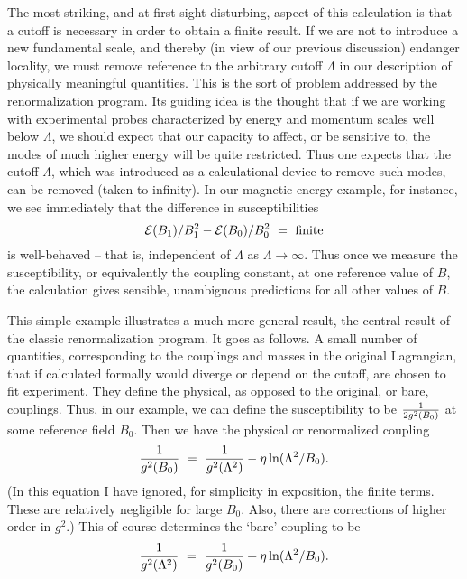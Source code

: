 \documentclass[aps,epsf]{revtex4}
\begin{document}
The most striking, and at first sight
disturbing, aspect of this calculation is that a cutoff is necessary
in order to obtain a finite result.  If we are not to introduce a new
fundamental scale, and thereby (in view of our previous discussion) endanger
locality, we must remove reference to the arbitrary cutoff $\Lambda$
in our description of physically meaningful quantities.  This is the
sort of problem addressed by the renormalization program.  Its guiding
idea is the thought that if we are working with experimental probes
characterized by energy and momentum scales well below $\Lambda$, we
should expect that our capacity to affect, or be sensitive to, the
modes of much higher energy will be quite restricted.  Thus one
expects that the cutoff $\Lambda$, which was
introduced as a calculational device to remove such modes, can be
removed (taken to infinity).  In our magnetic energy example, for
instance, we see immediately that the difference in
susceptibilities
\begin{equation}
{\cal E}(B_1) /B_1^2 - {\cal
E}(B_0)/B_0^2 ~=~ {\rm finite}
\end{equation}
is well-behaved -- that
is, independent of $\Lambda$ as $\Lambda \rightarrow \infty$.  Thus
once we measure the susceptibility, or equivalently the coupling
constant, at one reference value of $B$, the calculation gives
sensible, unambiguous predictions for all other values of $B$.  

This
simple example illustrates a much more general result, the central
result of the classic renormalization program.  It goes as follows.  A
small number of quantities, corresponding to the couplings and masses
in the original Lagrangian, that if calculated formally would diverge
or depend on the cutoff, are chosen to fit experiment.  They define
the physical, as opposed to the original, or bare, couplings.  Thus,
in our example, we can define the susceptibility to be ${1\over 2
g^2(B_0)}$ at some reference field $B_0$.  Then we have the physical or
renormalized coupling
\begin{equation}
{1\over g^2(B_0)} ~=~ {1\over
g^2(\Lambda^2) } - \eta \ln
(\Lambda^2/B_0).\label{eq:dfncouple}
\end{equation}
(In this equation I
have ignored, for simplicity in exposition, the finite terms.  These
are relatively negligible for large $B_0$.  Also, there are
corrections of higher order in $g^2$.) This of course determines the
`bare' coupling to be
\begin{equation}{1\over g^2(\Lambda^2)} ~=~
{1\over g^2(B_0)} +\eta \ln
(\Lambda^2/B_0).\label{eq:barecouple}
\end{equation}
\end{document}
